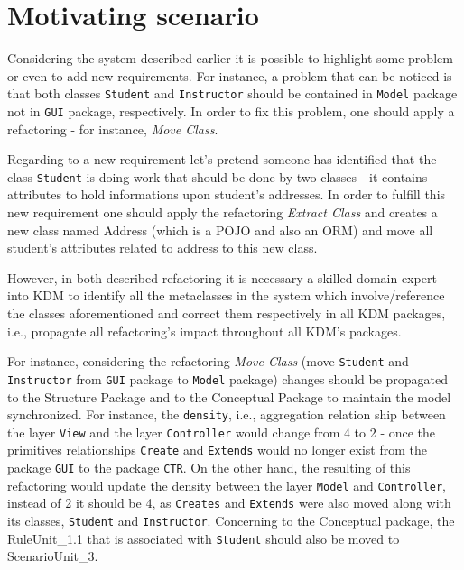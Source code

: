 \section{Motivating  scenario} %
\label{sec:motivation_and_running_example}
Considering the system described earlier it is possible to highlight some problem or even to add new requirements. For instance, a problem that can be noticed is that both classes \texttt{Student} and \texttt{Instructor} should be contained in \texttt{Model} package not in \texttt{GUI} package, respectively. In order to fix this problem, one should apply a refactoring - for instance, \textit{Move Class}.
%

%

Regarding to a new requirement let's pretend someone has identified that the class \texttt{Student} is doing work that should be done by two classes - it contains attributes to hold informations upon student's addresses. In order to fulfill this new requirement one should apply the refactoring \textit{Extract Class} and creates a new class named Address (which is a POJO and also an ORM) and move all student's attributes related to address to this new class.


However, in both described refactoring it is necessary a skilled domain expert into KDM to identify all the metaclasses in the system which involve/reference the classes aforementioned and correct them respectively in all KDM packages, i.e., propagate all refactoring's impact throughout all KDM's packages. 

For instance, considering the refactoring \textit{Move Class} (move \texttt{Student} and \texttt{Instructor} from \texttt{GUI} package to \texttt{Model} package) changes should be propagated to the Structure Package and to the Conceptual Package to maintain the model synchronized. For instance, the \texttt{density}, i.e., aggregation relation ship between the layer \texttt{View} and the layer \texttt{Controller} would change from 4 to 2 - once the primitives relationships \texttt{Create} and \texttt{Extends} would no longer exist from the package \texttt{GUI} to the package \texttt{CTR}. On the other hand, the resulting of this refactoring would update the density between the layer \texttt{Model} and \texttt{Controller}, instead of 2 it should be 4, as \texttt{Creates} and \texttt{Extends} were also moved along with its classes, \texttt{Student} and \texttt{Instructor}. Concerning to the Conceptual package, the  RuleUnit\_1.1 that is associated with \texttt{Student} should also be moved to ScenarioUnit\_3. 

